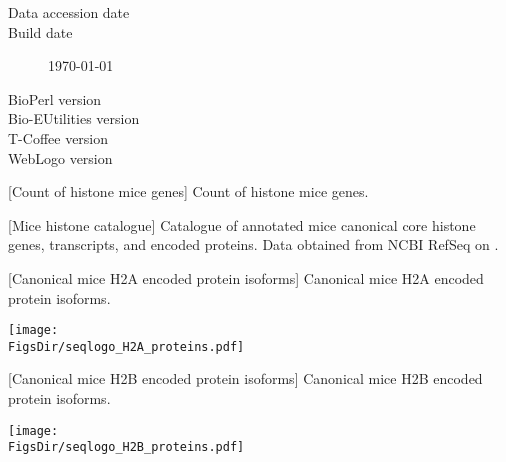   \begin{description}
    \item[Data accession date] \hfill \newline
      \printdate{\SequencesDate}
    \item[Build date] \hfill \newline
      \today
    \item[BioPerl version] \hfill \newline
      \BioPerlVersion{}
    \item[Bio-EUtilities version] \hfill \newline
      \BioEUtilitiesVersion
    \item[T-Coffee version] \hfill \newline
      \TCoffeVersion
    \item[WebLogo version] \hfill \newline
      \WebLogoVersion
  \end{description}

  \newpage
  \begin{center}
  [Count of histone mice genes]%
                   {Count of histone mice genes.}
  
  \end{center}

  \newpage
  \begin{center}
  [Mice histone catalogue]{%
    Catalogue of annotated mice canonical core histone genes, transcripts,
    and encoded proteins.
    Data obtained from NCBI RefSeq \citep{OLearyRefseq2016} on \SequencesDate{}.
  }
  \label{tab:mice:histone-catalogue}
  
  \end{center}

  \newpage
  \begin{center}
  [Canonical mice H2A encoded protein isoforms]%
                   {Canonical mice H2A encoded protein isoforms.}
  
  \texttt{[image: \\FigsDir/seqlogo\_H2A\_proteins.pdf]}
  \end{center}

  \newpage
  \begin{center}
  [Canonical mice H2B encoded protein isoforms]%
                   {Canonical mice H2B encoded protein isoforms.}
  
  \texttt{[image: \\FigsDir/seqlogo\_H2B\_proteins.pdf]}
  \end{center}

